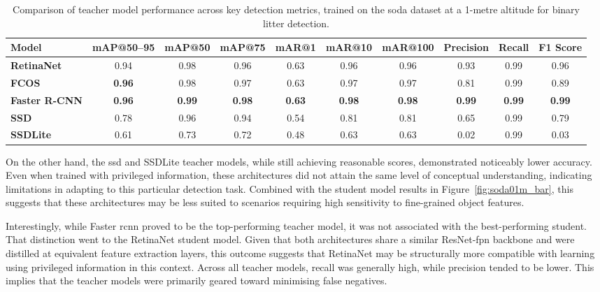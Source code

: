 \begin{table}[!ht]
    \centering
    \begin{adjustbox}{max width=\textwidth}
    \renewcommand{\arraystretch}{1.5}
    \begin{tabular}{|l|c|c|c|c|c|c|c|c|c|}
        \hline%
        \textbf{Model} & \textbf{mAP@50--95} & \textbf{mAP@50} & \textbf{mAP@75} & \textbf{mAR@1} & \textbf{mAR@10} & \textbf{mAR@100} & \textbf{Precision} & \textbf{Recall} & \textbf{F1 Score} \\ \hline \hline
        \textbf{RetinaNet} & 0.94 & 0.98 & 0.96 & 0.63 & 0.96 & 0.96 & 0.93 & 0.99 & 0.96 \\\hline
        \textbf{FCOS} & \textbf{0.96} & 0.98 & 0.97 & 0.63 & 0.97 & 0.97 & 0.81 & 0.99 & 0.89 \\\hline
        \textbf{Faster R-CNN} & \textbf{0.96} & \textbf{0.99} & \textbf{0.98} & \textbf{0.63} & \textbf{0.98} & \textbf{0.98} & \textbf{0.99} & \textbf{0.99} & \textbf{0.99} \\\hline
        \textbf{SSD} & 0.78 & 0.96 & 0.94 & 0.54 & 0.81 & 0.81 & 0.65 & 0.99 & 0.79 \\\hline
        \textbf{SSDLite} & 0.61 & 0.73 & 0.72 & 0.48 & 0.63 & 0.63 & 0.02 & 0.99 & 0.03 \\
        \hline%
    \end{tabular}
    \renewcommand{\arraystretch}{1}
    \end{adjustbox}
    \caption{Comparison of teacher model performance across key detection metrics, trained on the \gls{soda} dataset at a 1-metre altitude for binary litter detection.}
    \label{tab:teacher_model_metrics_soda01m}
\end{table}

On the other hand, the \gls{ssd} and SSDLite teacher models, while still achieving reasonable scores, demonstrated noticeably lower accuracy. Even when trained with privileged information, these architectures did not attain the same level of conceptual understanding, indicating limitations in adapting to this particular detection task. Combined with the student model results in Figure~\ref{fig:soda01m_bar}, this suggests that these architectures may be less suited to scenarios requiring high sensitivity to fine-grained object features.

Interestingly, while Faster \gls{rcnn} proved to be the top-performing teacher model, it was not associated with the best-performing student. That distinction went to the RetinaNet student model. Given that both architectures share a similar ResNet-\gls{fpn} backbone and were distilled at equivalent feature extraction layers, this outcome suggests that RetinaNet may be structurally more compatible with learning using privileged information in this context.
Across all teacher models, recall was generally high, while precision tended to be lower. This implies that the teacher models were primarily geared toward minimising false negatives.

